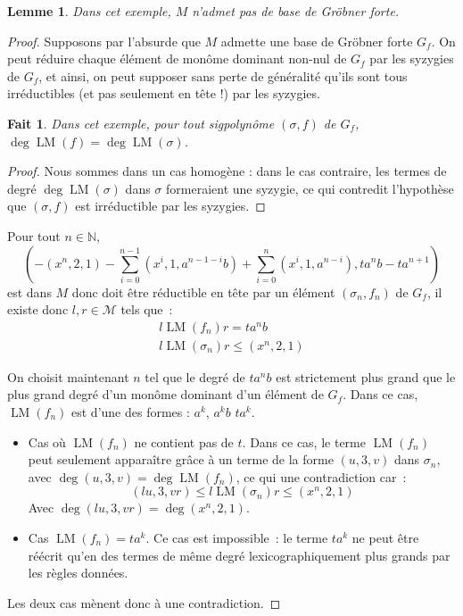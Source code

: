 \documentclass{article}
\newtheorem*{lem}{Lemme}
\newtheorem*{fact}{Fait}
\newcommand{\N}{\mathbb{N}}
\newcommand{\M}{\mathcal{M}}
\DeclareMathOperator{\LM}{LM}
\begin{document}
\begin{lem}
	Dans cet exemple, $M$ n'admet pas de base de Gröbner forte.
\end{lem}
\begin{proof}
	Supposons par l'absurde que $M$ admette une base de Gröbner forte $G_f$. On peut réduire chaque élément de monôme dominant non-nul de $G_f$ par les syzygies de $G_f$, et ainsi, on peut supposer sans perte de généralité qu'ils sont tous irréductibles (et pas seulement en tête !) par les syzygies.
	
	\begin{fact}
		Dans cet exemple, pour tout sigpolynôme $(\sigma, f)$ de $G_f$, $\deg{\LM(f)} = \deg{\LM(\sigma)}$.
	\end{fact}
	\begin{proof}
	Nous sommes dans un cas homogène : dans le cas contraire, les termes de degré $\deg{\LM(\sigma)}$ dans $\sigma$ formeraient une syzygie, ce qui contredit l'hypothèse que $(\sigma, f)$ est irréductible par les syzygies.
	\end{proof}
	
	Pour tout $n \in \N$,
	$$\left(- (x^n, 2, 1)
		- \sum_{i = 0}^{n - 1}(x^i, 1, a^{n - 1 - i}b) + 
		\sum_{i = 0}^{n} (x^i, 1, a^{n - i})
		, ta^nb - ta^{n+1} \right)$$
	est dans $M$ donc doit être réductible en tête par un élément $(\sigma_n, f_n)$ de $G_f$, il existe donc $l, r \in \M$ tels que~:
	\begin{align*}
		l\LM(f_n)r = ta^nb \\
		l \LM(\sigma_n) r \leq (x^n, 2, 1)
	\end{align*}
	
	On choisit maintenant $n$ tel que le degré de $ta^nb$ est strictement plus grand que le plus grand degré d'un monôme dominant d'un élément de $G_f$. 
	Dans ce cas, $\LM(f_n)$ est d'une des formes : $a^k$, $a^kb$ $ta^k$.
	
	\begin{itemize}
		\item Cas où $\LM(f_n)$ ne contient pas de $t$. 
		Dans ce cas, le terme $\LM(f_n)$ peut seulement apparaître grâce à un terme de la forme $(u, 3, v)$ dans $\sigma_n$, avec $\deg (u, 3, v) = \deg \LM(f_n)$, ce qui une contradiction car~:
		$$(lu, 3, vr) \leq l \LM(\sigma_n) r \leq (x^n, 2, 1)$$
		Avec $\deg (lu, 3, vr) = \deg (x^n, 2, 1)$.
		
		\item Cas $\LM(f_n) = ta^k$.
		Ce cas est impossible~: le terme $ta^k$ ne peut être réécrit qu'en des termes de même degré lexicographiquement plus grands par les règles données.
	\end{itemize}
	
	Les deux cas mènent donc à une contradiction.
\end{proof}
\end{document}
